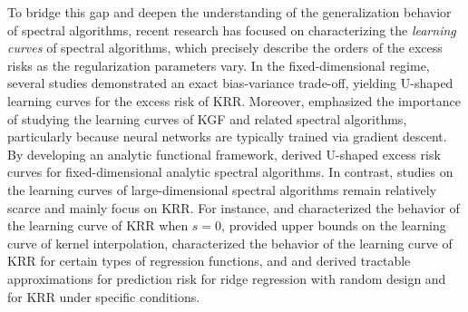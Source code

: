 \documentclass{article}
\theoremstyle{plain}
\theoremstyle{definition}
\theoremstyle{remark}
\begin{document}
To bridge this gap and deepen the understanding of the generalization behavior of spectral algorithms, recent research has focused on characterizing the \emph{learning curves} of spectral algorithms, which precisely describe the orders of the excess risks as the regularization parameters vary. 
In the fixed-dimensional regime, several studies \citep{Bordelon_Spectrum_2020, Cui2021GeneralizationER, jin2021learning, li2023asymptotic, cheng2024comprehensive} demonstrated an exact bias-variance trade-off, yielding U-shaped learning curves for the excess risk of KRR. 
Moreover, \cite{li2024generalization} emphasized the importance of studying the learning curves of KGF and related spectral algorithms, particularly because neural networks are typically trained via gradient descent. By developing an analytic functional framework, \cite{li2024generalization} derived U-shaped excess risk curves for fixed-dimensional analytic spectral algorithms.
In contrast, studies on the learning curves of large-dimensional spectral algorithms remain relatively scarce and mainly focus on KRR. 
For instance, 
\cite{xiao2022precise} and \cite{ mei2022generalization} characterized the behavior of the learning curve of KRR when $s=0$, 
\cite{barzilai2023generalization} provided upper bounds on the learning curve of kernel interpolation, 
\cite{aerni2023strong} characterized the behavior of the learning curve of KRR for certain types of regression functions,
and \cite{cheng2022dimension} and \cite{misiakiewicz2024non} derived tractable approximations for prediction risk for ridge regression with random design and for KRR under specific conditions.
\end{document}
